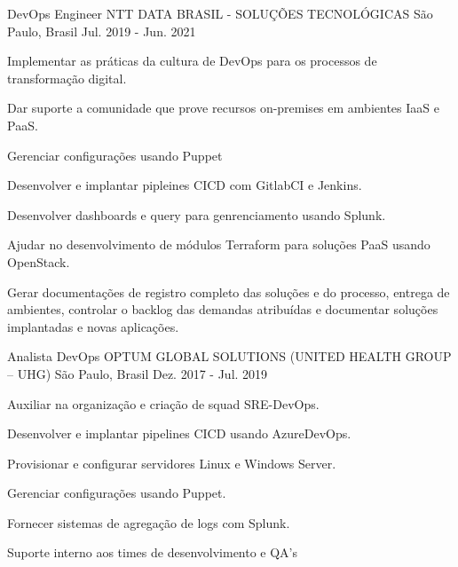 \begin{cventries}
  \cventry
    {DevOps Engineer} %
    {NTT DATA BRASIL - SOLUÇÕES TECNOLÓGICAS} %
    {São Paulo, Brasil} %
    {Jul. 2019 - Jun. 2021} %
    {
      \begin{cvitems} %
        \item {Implementar as práticas da cultura de DevOps para os processos de transformação digital.}
        \item {Dar suporte a comunidade que prove recursos on-premises em ambientes IaaS e PaaS.}
        \item {Gerenciar configurações usando Puppet}
        \item {Desenvolver e implantar pipleines CICD com GitlabCI e Jenkins.}
        \item {Desenvolver dashboards e query para genrenciamento usando Splunk.}
        \item {Ajudar no desenvolvimento de módulos Terraform para soluções PaaS usando OpenStack.}
        \item {Gerar documentações de registro completo das soluções e do processo, entrega de ambientes, controlar o backlog das demandas atribuídas e documentar soluções implantadas e novas aplicações.}
      \end{cvitems}
    }
  \break
  
  \cventry
    {Analista DevOps} %
    {OPTUM GLOBAL SOLUTIONS (UNITED HEALTH GROUP – UHG)} %
    {São Paulo, Brasil} %
    {Dez. 2017 - Jul. 2019} %
    {
      \begin{cvitems} %
        \item {Auxiliar na organização e criação de squad SRE-DevOps.}
        \item {Desenvolver e implantar pipelines CICD usando AzureDevOps.}
        \item {Provisionar e configurar servidores Linux e Windows Server.}
        \item {Gerenciar configurações usando Puppet.}
        \item {Fornecer sistemas de agregação de logs com Splunk.}
        \item {Suporte interno aos times de desenvolvimento e QA's}
      \end{cvitems}
    }


\end{cventries}